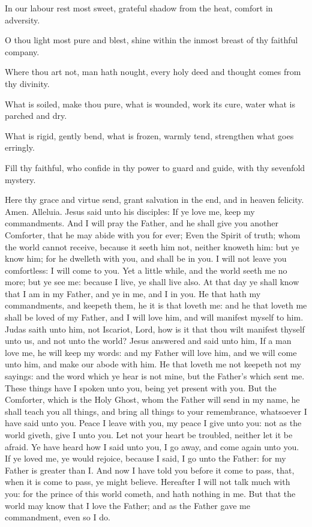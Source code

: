 In our labour rest most sweet, grateful shadow from the heat, comfort in adversity.

O thou light most pure and blest, shine within the inmost breast of thy faithful company.

Where thou art not, man hath nought, every holy deed and thought comes from thy divinity.

What is soiled, make thou pure, what is wounded, work its cure, water what is parched and dry.

What is rigid, gently bend, what is frozen, warmly tend, strengthen what goes erringly.

Fill thy faithful, who confide in thy power to guard and guide, with thy sevenfold mystery.

Here thy grace and virtue send, grant salvation in the end, and in heaven felicity. Amen. Alleluia.
 Jesus said unto his disciples: If ye love me, keep my commandments. And I will pray the Father, and he shall give you another Comforter, that he may abide with you for ever; Even the Spirit of truth; whom the world cannot receive, because it seeth him not, neither knoweth him: but ye know him; for he dwelleth with you, and shall be in you. I will not leave you comfortless: I will come to you. Yet a little while, and the world seeth me no more; but ye see me: because I live, ye shall live also. At that day ye shall know that I am in my Father, and ye in me, and I in you. He that hath my commandments, and keepeth them, he it is that loveth me: and he that loveth me shall be loved of my Father, and I will love him, and will manifest myself to him. Judas saith unto him, not Iscariot, Lord, how is it that thou wilt manifest thyself unto us, and not unto the world? Jesus answered and said unto him, If a man love me, he will keep my words: and my Father will love him, and we will come unto him, and make our abode with him. He that loveth me not keepeth not my sayings: and the word which ye hear is not mine, but the Father's which sent me. These things have I spoken unto you, being yet present with you. But the Comforter, which is the Holy Ghost, whom the Father will send in my name, he shall teach you all things, and bring all things to your remembrance, whatsoever I have said unto you. Peace I leave with you, my peace I give unto you: not as the world giveth, give I unto you. Let not your heart be troubled, neither let it be afraid. Ye have heard how I said unto you, I go away, and come again unto you. If ye loved me, ye would rejoice, because I said, I go unto the Father: for my Father is greater than I. And now I have told you before it come to pass, that, when it is come to pass, ye might believe. Hereafter I will not talk much with you: for the prince of this world cometh, and hath nothing in me. But that the world may know that I love the Father; and as the Father gave me commandment, even so I do.


